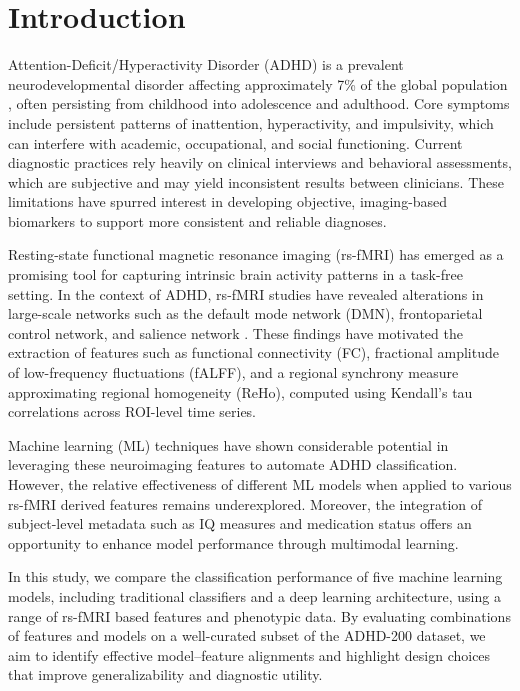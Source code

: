 \documentclass[conference]{IEEEtran}
\begin{document}
\section{Introduction}
Attention-Deficit/Hyperactivity Disorder (ADHD) is a prevalent neurodevelopmental disorder affecting approximately 7\% of the global population \cite{thomas2015}, often persisting from childhood into adolescence and adulthood. Core symptoms include persistent patterns of inattention, hyperactivity, and impulsivity, which can interfere with academic, occupational, and social functioning. Current diagnostic practices rely heavily on clinical interviews and behavioral assessments, which are subjective and may yield inconsistent results between clinicians. These limitations have spurred interest in developing objective, imaging-based biomarkers to support more consistent and reliable diagnoses.

Resting-state functional magnetic resonance imaging (rs-fMRI) has emerged as a promising tool for capturing intrinsic brain activity patterns in a task-free setting. In the context of ADHD, rs-fMRI studies have revealed alterations in large-scale networks such as the default mode network (DMN), frontoparietal control network, and salience network \cite{zhang2020}. These findings have motivated the extraction of features such as functional connectivity (FC), fractional amplitude of low-frequency fluctuations (fALFF), and a regional synchrony measure approximating regional homogeneity (ReHo), computed using Kendall's tau correlations across ROI-level time series.

Machine learning (ML) techniques have shown considerable potential in leveraging these neuroimaging features to automate ADHD classification. However, the relative effectiveness of different ML models when applied to various rs-fMRI derived features remains underexplored. Moreover, the integration of subject-level metadata such as IQ measures and medication status offers an opportunity to enhance model performance through multimodal learning.

In this study, we compare the classification performance of five machine learning models, including traditional classifiers and a deep learning architecture, using a range of rs-fMRI based features and phenotypic data. By evaluating combinations of features and models on a well-curated subset of the ADHD-200 dataset, we aim to identify effective model--feature alignments and highlight design choices that improve generalizability and diagnostic utility.
\end{document}
